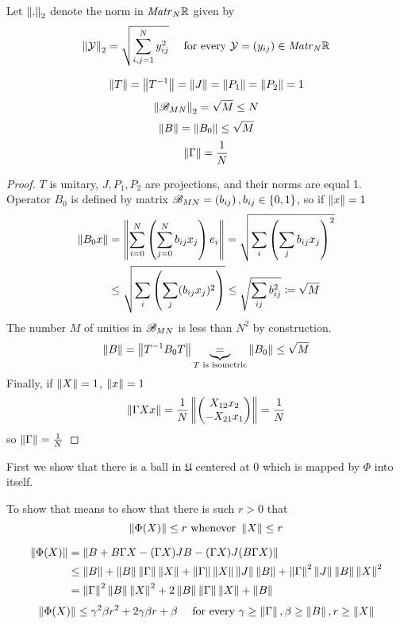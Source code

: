 \documentclass{article}
\begin{document}
Let \( \normex{2}{.} \) denote the norm in \( \matr{N}{\RR} \) given by
\[\normex{2}{\mathcal Y} = \sqrt{\sum_{i,j=1}^N y_{ij}^2} \quad\text{ for every } \mathcal Y = \left(y_{ij}\right) \in \matr{N}{\RR}\]
\begin{lemma}
    \[\norm T = \norm{T^{-1}} = \norm J = \norm{P_1} = \norm{P_2} = 1\]
    \[\normex{2}{\perturbmatrix{M}{N}} = \sqrt{M} \leq N\]
    \[\norm B = \norm{B_0} \leq \sqrt M\]
    \[\norm{\Gamma} = \frac{1}{N}\]
\end{lemma}
\begin{proof}
    \( T \) is unitary, \( J, P_1, P_2 \) are projections, and their norms are equal 1.
    Operator \( B_0 \) is defined by matrix \( \perturbmatrix{M}{N} = \left(b_{ij}\right), b_{ij}\in\{0,1\} \),
    so if \( \norm x = 1 \)
    \[
        \begin{split}
            \norm{B_0 x} &= \norm{\sum_{i=0}^N \left(\sum_{j=0}^N b_{ij} x_j\right) e_i}
            = \sqrt{\sum_i \left(\sum_j b_{ij} x_j\right)^2} \\
            &\leq \sqrt{\sum_i \left(\sum_j (b_{ij} x_j)^2\right)}
            \leq \sqrt{\sum_{ij} b_{ij}^2} \eqdef \sqrt M
        \end{split}
    \]
The number \( M \) of unities in \( \perturbmatrix{M}{N} \) is less than \( N^2 \) by construction.
\[\norm B = \norm{T^{-1} B_0 T} \underbrace{=}_{T \text{ is isometric}} \norm{B_0} \leq \sqrt M\]
    Finally, if \( \norm X = 1 \), \( \norm x = 1 \)
    \[\norm{\Gamma X x} = \frac1N \norm{\begin{pmatrix}X_{12}x_2 \\ -X_{21}x_1\end{pmatrix}} = \frac1N\]
    so \( \norm\Gamma = \frac1N \)
\end{proof}

First we show that there is a ball in \( \mathfrak U \) centered at \( 0 \)
which is mapped by \( \Phi \) into itself.

To show that
means to show that there is such \( r>0 \) that
\[\norm{\Phi(X)} \leq r \text{ whenever } \norm{X}\leq r\]

    \begin{align*}
        \norm{\Phi(X)} &=    \norm{B + B\Gamma X - (\Gamma X) JB - (\Gamma X)J(B\Gamma X)} \\
                     &\leq \norm{B} + \norm{B}\norm{\Gamma} \norm{X} + \norm{\Gamma}\norm{X}\norm{J}\norm{B} + \norm{\Gamma}^2\norm{J}\norm{B}\norm{X}^2 \\
                     & = \norm{\Gamma}^2\norm{B}\norm{X}^2 + 2\norm{B}\norm{\Gamma}\norm{X} + \norm{B}
    \end{align*}
    \begin{equation}
        \label{eq:phi_norm_b1}
        \norm{\Phi(X)}
        \leq
            \gamma^2\beta r^2 + 2\gamma\beta r + \beta
            \quad \text{ for every } \gamma\geq\norm{\Gamma}, \beta\geq\norm{B}, r\geq\norm{X}
    \end{equation}
\end{document}
